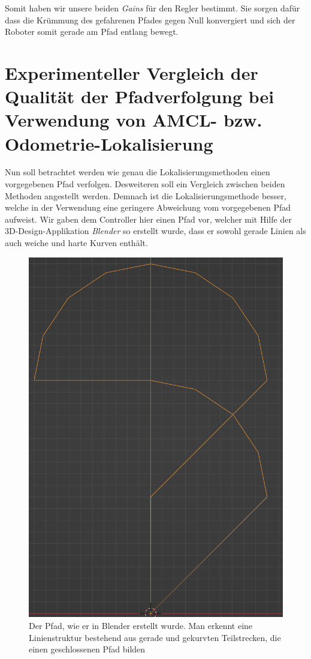 \documentclass[11pt,a4paper]{article}
\begin{document}
Somit haben wir unsere beiden \textit{Gains} für den Regler bestimmt. Sie sorgen dafür dass die Krümmung des gefahrenen Pfades gegen Null konvergiert und sich der Roboter 
somit gerade am Pfad entlang bewegt. 


\section{Experimenteller Vergleich der Qualität der Pfadverfolgung bei Verwendung von AMCL-  bzw. Odometrie-Lokalisierung}
Nun soll betrachtet werden wie genau die Lokalisierungsmethoden einen vorgegebenen Pfad verfolgen. Desweiteren soll ein Vergleich zwischen beiden Methoden angestellt werden. 
Demnach ist die Lokalisierungsmethode besser, welche in der Verwendung eine geringere Abweichung vom vorgegebenen Pfad aufweist. 
Wir gaben dem Controller hier einen Pfad vor, welcher mit Hilfe der 3D-Design-Applikation \textit{Blender} so erstellt wurde, dass er sowohl
gerade Linien als auch weiche und harte Kurven enthält.

\begin{figure}[ht]
\centering
\includegraphics[scale = 0.6]{pfadgrafik.png}
\caption{Der Pfad, wie er in Blender erstellt wurde. Man erkennt eine Linienstruktur bestehend aus gerade und gekurvten Teilstrecken, die einen geschlossenen Pfad bilden}
\label{fig: MessungExperiment}
\end{figure}
\end{document}
